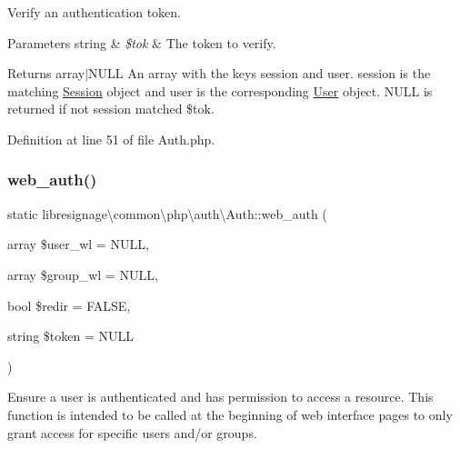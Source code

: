 Verify an authentication token.


\begin{DoxyParams}[1]{Parameters}
string & {\em \$tok} & The token to verify.\\
\hline
\end{DoxyParams}
\begin{DoxyReturn}{Returns}
array$\vert$\+N\+U\+LL An array with the keys \textquotesingle{}session\textquotesingle{} and \textquotesingle{}user\textquotesingle{}. \textquotesingle{}session\textquotesingle{} is the matching \hyperlink{classlibresignage_1_1common_1_1php_1_1auth_1_1Session}{Session} object and \textquotesingle{}user\textquotesingle{} is the corresponding \hyperlink{classlibresignage_1_1common_1_1php_1_1auth_1_1User}{User} object. N\+U\+LL is returned if not session matched \$tok. 
\end{DoxyReturn}


Definition at line 51 of file Auth.\+php.

\mbox{\label{classlibresignage_1_1common_1_1php_1_1auth_1_1Auth_a6e841f3f246174d63e6b7caa14273726}} 
\subsubsection{\texorpdfstring{web\+\_\+auth()}{web\_auth()}}
{\footnotesize\ttfamily static libresignage\textbackslash{}common\textbackslash{}php\textbackslash{}auth\textbackslash{}\+Auth\+::web\+\_\+auth (\begin{DoxyParamCaption}\item[{array}]{\$user\+\_\+wl = {\ttfamily NULL},  }\item[{array}]{\$group\+\_\+wl = {\ttfamily NULL},  }\item[{bool}]{\$redir = {\ttfamily FALSE},  }\item[{string}]{\$token = {\ttfamily NULL} }\end{DoxyParamCaption})\hspace{0.3cm}{\ttfamily [static]}}

Ensure a user is authenticated and has permission to access a resource. This function is intended to be called at the beginning of web interface pages to only grant access for specific users and/or groups.


